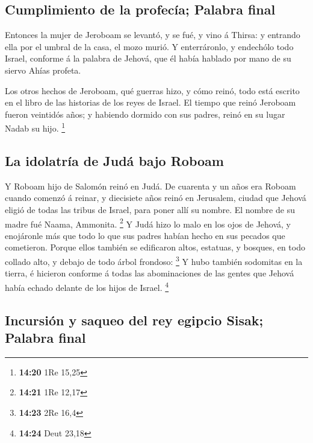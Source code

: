 \hypertarget{cumplimiento-de-la-profecuxeda-palabra-final}{%
\subsection{Cumplimiento de la profecía; Palabra
final}\label{cumplimiento-de-la-profecuxeda-palabra-final}}

 Entonces la mujer de Jeroboam se levantó, y se fué, y
vino á Thirsa: y entrando ella por el umbral de la casa, el mozo murió.
 Y enterráronlo, y endechólo todo Israel, conforme á la
palabra de Jehová, que él había hablado por mano de su siervo Ahías
profeta.

 Los otros hechos de Jeroboam, qué guerras hizo, y cómo
reinó, todo está escrito en el libro de las historias de los reyes de
Israel.  El tiempo que reinó Jeroboam fueron veintidós
años; y habiendo dormido con sus padres, reinó en su lugar Nadab su
hijo. \footnote{\textbf{14:20} 1Re 15,25}

\hypertarget{la-idolatruxeda-de-juduxe1-bajo-roboam}{%
\subsection{La idolatría de Judá bajo
Roboam}\label{la-idolatruxeda-de-juduxe1-bajo-roboam}}

 Y Roboam hijo de Salomón reinó en Judá. De cuarenta y un
años era Roboam cuando comenzó á reinar, y diecisiete años reinó en
Jerusalem, ciudad que Jehová eligió de todas las tribus de Israel, para
poner allí su nombre. El nombre de su madre fué Naama, Ammonita.
\footnote{\textbf{14:21} 1Re 12,17}  Y Judá hizo lo malo
en los ojos de Jehová, y enojáronle más que todo lo que sus padres
habían hecho en sus pecados que cometieron.  Porque ellos
también se edificaron altos, estatuas, y bosques, en todo collado alto,
y debajo de todo árbol frondoso: \footnote{\textbf{14:23} 2Re 16,4}
 Y hubo también sodomitas en la tierra, é hicieron
conforme á todas las abominaciones de las gentes que Jehová había echado
delante de los hijos de Israel. \footnote{\textbf{14:24} Deut 23,18}

\hypertarget{incursiuxf3n-y-saqueo-del-rey-egipcio-sisak-palabra-final}{%
\subsection{Incursión y saqueo del rey egipcio Sisak; Palabra
final}\label{incursiuxf3n-y-saqueo-del-rey-egipcio-sisak-palabra-final}}

